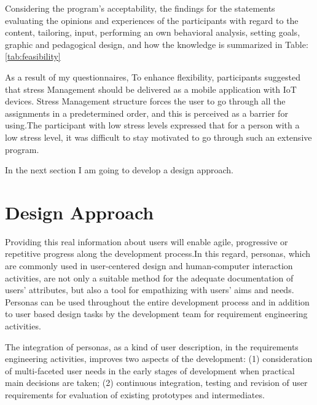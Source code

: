 Considering the program's acceptability, the findings for the statements evaluating the opinions and experiences of the participants with regard to the content, tailoring, input, performing an own behavioral analysis, setting goals, graphic and pedagogical design, and how the knowledge is summarized in Table: \ref{tab:feasibility}

As a result of my questionnaires, To enhance flexibility, participants suggested that stress Management should be delivered as a mobile application with IoT devices. Stress Management structure forces the user to go through all the assignments in a predetermined order, and this is perceived as a barrier for using.The participant with low stress levels expressed that for a person with a low stress level, it was difficult to stay motivated to go through such an extensive program.

In the next section I am going to develop a design approach.

\section{Design Approach}
Providing this real information about users will enable agile, progressive or repetitive progress along the development process.In this regard, personas, which are commonly used in user-centered design and human-computer interaction activities, are not only a suitable method for the adequate documentation of users’ attributes, but also a tool for empathizing with users’ aims and needs. Personas can be used throughout the entire development process and in addition to user based design tasks by the development team for requirement engineering activities.

The integration of personas, as a kind of user description, in the requirements engineering activities, improves two aspects of the development: (1) consideration of multi-faceted user needs in the early stages of development when practical main decisions are taken; (2) continuous integration, testing and revision of user requirements for evaluation of existing prototypes and intermediates.\citep{Mayas2016PersonasChallenges}

